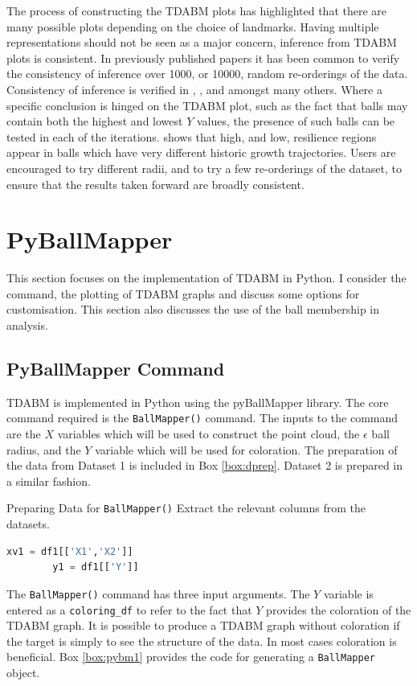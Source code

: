 \documentclass{article}
\begin{document}
The process of constructing the TDABM plots has highlighted that there are many possible plots depending on the choice of landmarks. Having multiple representations should not be seen as a major concern, inference from TDABM plots is consistent. In previously published papers it has been common to verify the consistency of inference over 1000, or 10000, random re-orderings of the data. Consistency of inference is verified in  \cite{dlotko2022topological}, \cite{rudkin2023economic}, \cite{rudkin2024return} and \cite{rudkin2024topology} amongst many others. Where a specific conclusion is hinged on the TDABM plot, such as the fact that balls may contain both the highest and lowest $Y$ values, the presence of such balls can be tested in each of the iterations. \cite{rudkin2023regional} shows that high, and low, resilience regions appear in balls which have very different historic growth trajectories. Users are encouraged to try different radii, and to try a few re-orderings of the dataset, to ensure that the results taken forward are broadly consistent.

\section{PyBallMapper}
\label{sec:pybm}

This section focuses on the implementation of TDABM in Python. I consider the command, the plotting of TDABM graphs and discuss some options for customisation. This section also discusses the use of the ball membership in analysis.

\subsection{PyBallMapper Command}

TDABM is implemented in Python using the pyBallMapper library. The core command required is the \texttt{BallMapper()} command. The inputs to the command are the $X$ variables which will be used to construct the point cloud, the $\epsilon$ ball radius, and the $Y$ variable which will be used for coloration. The preparation of the data from Dataset 1 is included in Box \ref{box:dprep}. Dataset 2 is prepared in a similar fashion.

\begin{mybox}[label=box:dprep]{Preparing Data for \texttt{BallMapper()}}
	Extract the relevant columns from the datasets. 
	\begin{lstlisting}[language=Python]
		xv1 = df1[['X1','X2']]
		y1 = df1[['Y']]
	\end{lstlisting}
\end{mybox}
The \texttt{BallMapper()} command has three input arguments. The $Y$ variable is entered as a \texttt{coloring\_df} to refer to the fact that $Y$ provides the coloration of the TDABM graph. It is possible to produce a TDABM graph without coloration if the target is simply to see the structure of the data. In most cases coloration is beneficial. Box \ref{box:pybm1} provides the code for generating a \texttt{BallMapper} object.
\end{document}

